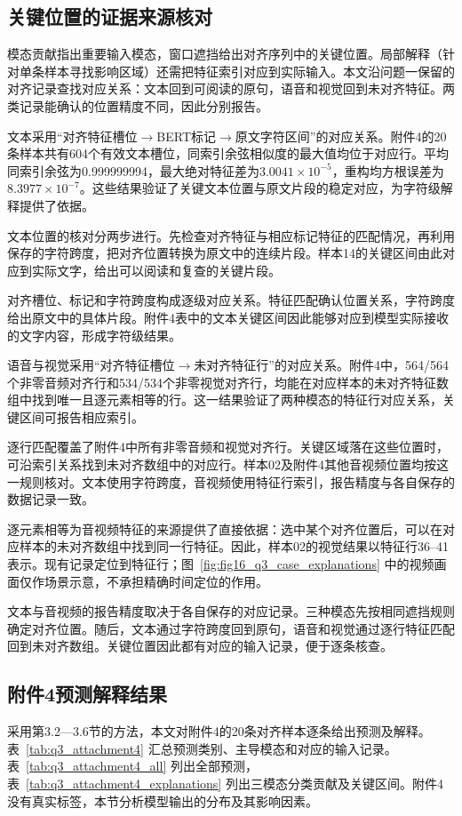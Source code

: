 \subsection{关键位置的证据来源核对}\label{subsec:q3_grounding}
模态贡献指出重要输入模态，窗口遮挡给出对齐序列中的关键位置。局部解释（针对单条样本寻找影响区域）还需把特征索引对应到实际输入。本文沿问题一保留的对齐记录查找对应关系：文本回到可阅读的原句，语音和视觉回到未对齐特征。两类记录能确认的位置精度不同，因此分别报告。

文本采用“对齐特征槽位$\rightarrow$BERT标记$\rightarrow$原文字符区间”的对应关系。附件4的20条样本共有604个有效文本槽位，同索引余弦相似度的最大值均位于对应行。平均同索引余弦为0.999999994，最大绝对特征差为$3.0041\times10^{-5}$，重构均方根误差为$8.3977\times10^{-7}$。这些结果验证了关键文本位置与原文片段的稳定对应，为字符级解释提供了依据。

文本位置的核对分两步进行。先检查对齐特征与相应标记特征的匹配情况，再利用保存的字符跨度，把对齐位置转换为原文中的连续片段。样本14的关键区间由此对应到实际文字，给出可以阅读和复查的关键片段。

对齐槽位、标记和字符跨度构成逐级对应关系。特征匹配确认位置关系，字符跨度给出原文中的具体片段。附件4表中的文本关键区间因此能够对应到模型实际接收的文字内容，形成字符级结果。

语音与视觉采用“对齐特征槽位$\rightarrow$未对齐特征行”的对应关系。附件4中，564/564个非零音频对齐行和534/534个非零视觉对齐行，均能在对应样本的未对齐特征数组中找到唯一且逐元素相等的行。这一结果验证了两种模态的特征行对应关系，关键区间可报告相应索引。

逐行匹配覆盖了附件4中所有非零音频和视觉对齐行。关键区域落在这些位置时，可沿索引关系找到未对齐数组中的对应行。样本02及附件4其他音视频位置均按这一规则核对。文本使用字符跨度，音视频使用特征行索引，报告精度与各自保存的数据记录一致。

逐元素相等为音视频特征的来源提供了直接依据：选中某个对齐位置后，可以在对应样本的未对齐数组中找到同一行特征。因此，样本02的视觉结果以特征行36--41表示。现有记录定位到特征行；图~\ref{fig:fig16_q3_case_explanations} 中的视频画面仅作场景示意，不承担精确时间定位的作用。

文本与音视频的报告精度取决于各自保存的对应记录。三种模态先按相同遮挡规则确定对齐位置。随后，文本通过字符跨度回到原句，语音和视觉通过逐行特征匹配回到未对齐数组。关键位置因此都有对应的输入记录，便于逐条核查。

\subsection{附件4预测解释结果}\label{subsec:q3_attachment4}
采用第3.2—3.6节的方法，本文对附件4的20条对齐样本逐条给出预测及解释。表~\ref{tab:q3_attachment4} 汇总预测类别、主导模态和对应的输入记录。表~\ref{tab:q3_attachment4_all} 列出全部预测，表~\ref{tab:q3_attachment4_explanations} 列出三模态分类贡献及关键区间。附件4没有真实标签，本节分析模型输出的分布及其影响因素。

